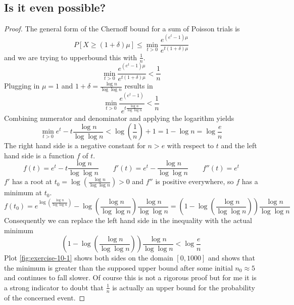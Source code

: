 \documentclass[10pt,a4paper]{article}
\begin{document}
\subsection*{Is it even possible?}

\begin{proof}
  The general form of the Chernoff bound for a sum of Poisson trials is
  \begin{equation*}
    P\left[ X \ge (1 + \delta)\mu \right] \le \min_{t > 0} \frac{e^{(e^{t} - 1)\mu}}{e^{t(1 + \delta)\mu}}
  \end{equation*}
  and we are trying to upperbound this with $\frac{1}{n}$.
  \begin{equation*}
    \min_{t > 0} \frac{e^{(e^{t} - 1)\mu}}{e^{t(1 + \delta)\mu}} < \frac{1}{n}
  \end{equation*}
  Plugging in $\mu = 1$ and $1 + \delta = \frac{\log n}{\log \log n}$ results in
  \begin{equation*}
    \min_{t > 0} \frac{e^{(e^{t} - 1)}}{e^{t \frac{\log n}{\log \log n}}} < \frac{1}{n}
  \end{equation*}
  Combining numerator and denominator and applying the logarithm yields
  \begin{equation*}
    \min_{t > 0} e^{t} - t \frac{\log n}{\log \log n} < \log\left(\frac{1}{n}\right) + 1 = 1 - \log n = \log \frac{e}{n}
  \end{equation*}
  The right hand side is a negative constant for $n > e$ with respect to $t$ and the left hand side is a function $f$ of $t$.
  \begin{equation*}
    f(t) = e^{t} - t \frac{\log n}{\log \log n} \qquad f'(t) = e^{t} - \frac{\log n}{\log \log n} \qquad f''(t) = e^{t}
  \end{equation*}
  $f'$ has a root at $t_{0} = \log\left( \frac{\log n}{\log \log n} \right) > 0$ and $f''$ is positive everywhere, so $f$ has a minimum at $t_{0}$.
  \begin{equation*}
    f(t_{0}) = e^{\log\left( \frac{\log n}{\log \log n} \right)} - \log\left( \frac{\log n}{\log \log n} \right) \frac{\log n}{\log \log n} = \left(1 - \log\left( \frac{\log n}{\log \log n} \right)\right) \frac{\log n}{\log \log n}
  \end{equation*}
  Consequently we can replace the left hand side in the inequality with the actual minimum
  \begin{equation*}
     \left(1 - \log\left( \frac{\log n}{\log \log n} \right)\right) \frac{\log n}{\log \log n} < \log \frac{e}{n}
  \end{equation*}
  Plot \ref{fig:exercise-10-1} shows both sides on the domain $[0, 1000]$ and shows that the minimum is greater than the supposed upper bound after some initial $n_{0} \approx 5$ and continues to fall slower.
  Of course this is not a rigorous proof but for me it is a strong indicator to doubt that $\frac{1}{n}$ is actually an upper bound for the probability of the concerned event.


\end{proof}
\end{document}
